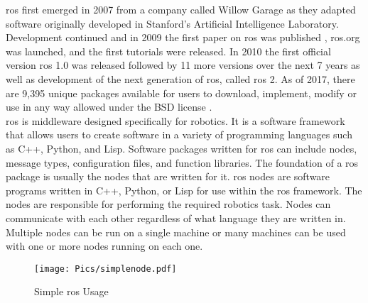 \acrshort{ros} first emerged in 2007 from a company called Willow Garage as they adapted software originally developed in Stanford's Artificial Intelligence Laboratory. Development continued and in 2009 the first paper on \acrshort{ros} was published \cite{rosfirst}, \acrshort{ros}.org was launched, and the first tutorials were released. In 2010 the first official version \acrshort{ros} 1.0 was released followed by 11 more versions over the next 7 years as well as development of the next generation of \acrshort{ros}, called \acrshort{ros} 2. As of 2017, there are 9,395 unique packages available for users to download, implement, modify or use in any way allowed under the BSD license \cite{bsd}.\\

\acrshort{ros} is middleware designed specifically for robotics. It is a software framework that allows users to create software in a variety of programming languages such as C++, Python, and Lisp. Software packages written for \acrshort{ros} can include nodes, message types, configuration files, and function libraries. The foundation of a \acrshort{ros} package is usually the nodes that are written for it. \acrshort{ros} nodes are software programs written in C++, Python, or Lisp for use within the \acrshort{ros} framework. The nodes are responsible for performing the required robotics task. Nodes can communicate with each other regardless of what language they are written in. Multiple nodes can be run on a single machine or many machines can be used with one or more nodes running on each one.\\

\begin{figure}[h!]
    \centering
    \texttt{[image: Pics/simplenode.pdf]}
    \caption{Simple \acrshort{ros} Usage}
    \label{fig:rosmessage}
\end{figure}

